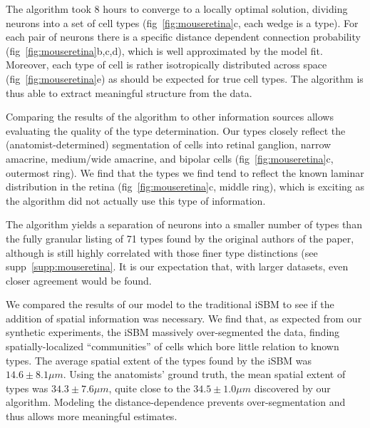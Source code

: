 \documentclass{article}
\begin{document}
The algorithm took 8 hours to converge to a locally optimal solution,
dividing neurons into a set of cell types (fig~\ref{fig:mouseretina}c, each
wedge is a type). For each pair of neurons there is a specific
distance dependent connection probability (fig~\ref{fig:mouseretina}b,c,d),
which is well approximated by the model fit. Moreover, each type of
cell is rather isotropically distributed across space
(fig~\ref{fig:mouseretina}e) as should be expected for true cell types. The
algorithm is thus able to extract meaningful structure from the data.

Comparing the results of the algorithm to other information sources
allows evaluating the quality of the type determination. Our types
closely reflect the (anatomist-determined) segmentation of cells into
retinal ganglion, narrow amacrine, medium/wide amacrine, and bipolar
cells (fig~\ref{fig:mouseretina}c, outermost ring). We find that the
types we find tend to reflect the known laminar distribution in the
retina (fig~\ref{fig:mouseretina}c, middle ring), which is exciting as
the algorithm did not actually use this type of information.


The algorithm yields a separation of neurons into a smaller number of
types than the fully granular listing of 71 types found by the
original authors of the paper, although is still highly correlated
with those finer type distinctions (see
supp~\ref{supp:mouseretina}. It is our expectation that, with larger
datasets, even closer agreement would be found.


We compared the results of our model to the traditional iSBM to see if
the addition of spatial information was necessary. We find that, as
expected from our synthetic experiments, the iSBM massively
over-segmented the data, finding spatially-localized “communities” of
cells which bore little relation to known types.  The average spatial
extent of the types found by the iSBM was $14.6\pm8.1 \mu m$. Using
the anatomists' ground truth, the mean spatial extent of types was
$34.3\pm7.6 \mu m$, quite close to the $34.5\pm 1.0 \mu m$ discovered
by our algorithm. Modeling the distance-dependence prevents
over-segmentation and thus allows more meaningful estimates.


\end{document}
